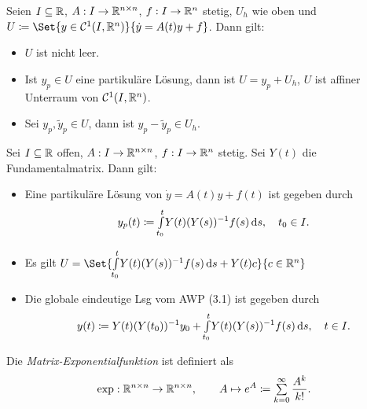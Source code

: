 \documentclass{cheat-sheet}
\begin{document}
\begin{satz}%
  Seien $I \subseteq \mathbb{R}$, $A : I \to \mathbb{R}^{n \times n}$, $f : I \to \mathbb{R}^n$ stetig, $U_h$ wie oben und $U \coloneqq \Set{ y \in \mathcal{C}^1(I, \R^n) }{ \dot{y} = A(t) y + f }$. Dann gilt:
  \begin{itemize}
    \item $U$ ist nicht leer.
    \item Ist $y_p \in U$ eine partikuläre Lösung, dann ist $U = y_p + U_h$, \dh{} $U$ ist affiner Unterraum von $\mathcal{C}^1(I, \mathbb{R}^n)$.
    \item Sei $y_p, \tilde{y}_p \in U$, dann ist $y_p - \tilde{y}_p \in U_h$.
  \end{itemize}
\end{satz}

\begin{satz}
  Sei $I \subseteq \mathbb{R}$ offen, $A : I \to \mathbb{R}^{n \times n}$, $f : I \to \mathbb{R}^n$ stetig. Sei $Y(t)$ die Fundamentalmatrix. Dann gilt:
  \begin{itemize}
    \item Eine partikuläre Lösung von $\dot{y} = A(t) y + f(t)$ ist gegeben durch
    \[ y_p(t) \coloneqq {\textstyle \int\limits_{t_0}^{t}} Y(t) (Y(s))^{-1} f(s) \,\mathrm{d} s, \quad t_0 \in I. \]
    \item Es gilt $U = \Set{ \Int{t_0}{t}{Y(t) (Y(s))^{-1} f(s)}{s} + Y(t) c }{ c \in \R^n }$
    \item Die globale eindeutige Lsg vom AWP (3.1) ist gegeben durch
    \[ y(t) \coloneqq Y(t) (Y(t_0))^{-1} y_0 + {\textstyle \int\limits_{t_0}^{t}} Y(t) (Y(s))^{-1} f(s) \,\mathrm{d} s, \quad t \in I. \]
  \end{itemize}
\end{satz}


\begin{defn}
  Die \emph{Matrix-Exponentialfunktion} ist definiert als
  \[ \exp : \R^{n \times n} \to \R^{n \times n}, \qquad A \mapsto e^A \coloneqq \sum_{k=0}^\infty \frac{A^k}{k!}. \]
\end{defn}
\end{document}
